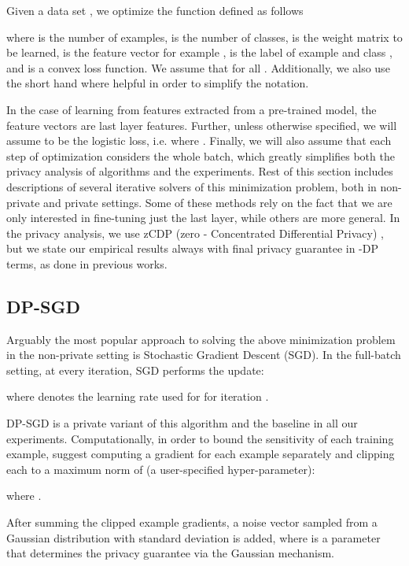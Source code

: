 \documentclass[letterpaper]{article} \usepackage{fullpage}
\begin{document}
Given a data set , we optimize the function  defined as follows



where  is the number of examples,  is the number of classes,  is the weight matrix to be learned,  is the feature vector for example ,  is the label of example  and class , and  is a convex loss function. We assume that  for all . Additionally, we also use the short hand   where helpful in order to simplify the notation.

In the case of learning from features extracted from a pre-trained model, the feature vectors  are last layer features. Further, unless otherwise specified, we will assume  to be the logistic loss, i.e.  where . Finally, we will also assume that each step of optimization considers the whole batch, which greatly simplifies both the privacy analysis of algorithms and the experiments. Rest of this section includes descriptions of several iterative solvers of this minimization problem, both in non-private and private settings. Some of these methods rely on the fact that we are only interested in fine-tuning just the last layer, while others are more general. In the privacy analysis, we use zCDP (zero - Concentrated Differential Privacy) \cite{bun2016concentrated}, but we state our empirical results always with final privacy guarantee in -DP terms, as done in previous works. 


\subsection{DP-SGD}
Arguably the most popular approach to solving the above minimization problem in the non-private setting is Stochastic Gradient Descent (SGD).
In the full-batch setting, at every iteration, SGD performs the update:

where  denotes the learning rate used for for iteration .

DP-SGD is a private variant of this algorithm and the baseline in all our experiments. Computationally, in order to bound the sensitivity of each training example, \cite{abadi2016dpsgd} suggest computing a gradient for each example separately and clipping each to a maximum norm of  (a user-specified hyper-parameter):

where .

After summing the clipped example gradients, a noise vector sampled from a Gaussian distribution with standard deviation  is added, where  is a parameter that determines the privacy guarantee via the Gaussian mechanism. 
\end{document}
